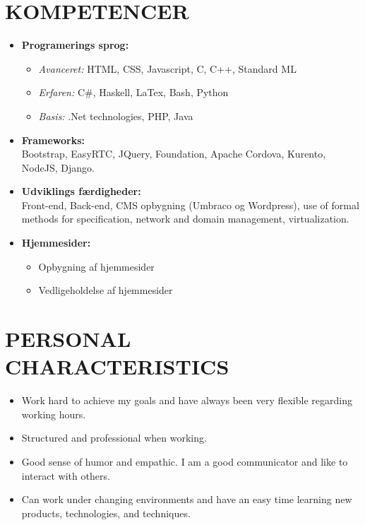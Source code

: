 \documentclass[11pt,a4paper,sans]{moderncv}        %
\begin{document}
\section{KOMPETENCER}
\begin{itemize}
\item \textbf{Programerings sprog:}
\begin{itemize}
\item \textit{Avanceret:} HTML, CSS, Javascript, C, C++, Standard ML
\item \textit{Erfaren:} C\#, Haskell, LaTex, Bash, Python
\item \textit{Basis:} .Net technologies, PHP, Java
\end{itemize}
\bigskip

\item \textbf{Frameworks:}\\
Bootstrap, EasyRTC, JQuery, Foundation, Apache Cordova, Kurento, NodeJS, Django.
\bigskip

\item \textbf{Udviklings færdigheder:}\\
Front-end, Back-end, CMS opbygning (Umbraco og Wordpress), use of formal methods for specification, network and domain management, virtualization.
\bigskip

\item \textbf{Hjemmesider:}
\begin{itemize}
\item Opbygning af hjemmesider 
\item Vedligeholdelse af hjemmesider
\end{itemize}
\end{itemize}
\fi

\ifenglish
\section{PERSONAL CHARACTERISTICS}
\begin{itemize}
\item Work hard to achieve my goals and have always been very flexible regarding working hours.
\item Structured and professional when working.
\item Good sense of humor and empathic. I am a good communicator and like to interact with others.
\item Can work under changing environments and have an easy time learning new products, technologies, and techniques.
\end{itemize}
\else
\end{document}
